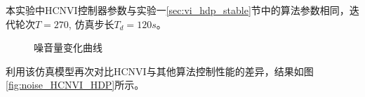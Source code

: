 本实验中HCNVI控制器参数与实验一\ref{sec:vi_hdp_stable}节中的算法参数相同，迭代轮次$T=270$,
仿真步长$T_d=120s$。
\begin{figure}[ht]
    \caption{噪音量变化曲线}
    \label{fig:noise_noise_input}
\end{figure}
利用该仿真模型再次对比HCNVI与其他算法控制性能的差异，结果如图\ref{fig:noise_HCNVI_HDP}所示。
